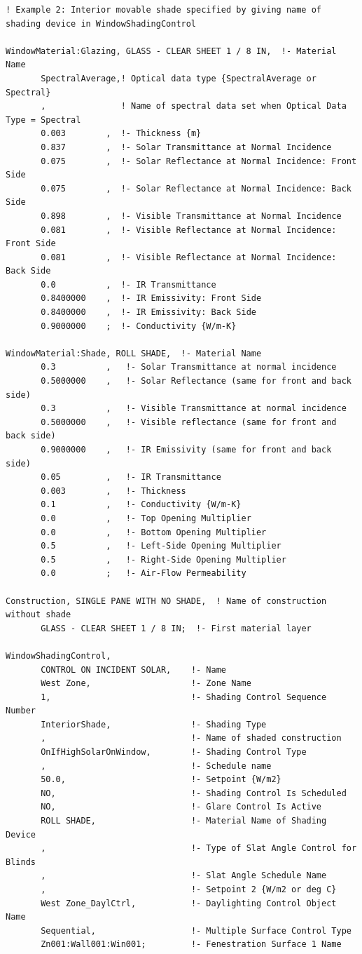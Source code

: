 \begin{lstlisting}
! Example 2: Interior movable shade specified by giving name of shading device in WindowShadingControl

WindowMaterial:Glazing, GLASS - CLEAR SHEET 1 / 8 IN,  !- Material Name
       SpectralAverage,! Optical data type {SpectralAverage or Spectral}
       ,               ! Name of spectral data set when Optical Data Type = Spectral
       0.003        ,  !- Thickness {m}
       0.837        ,  !- Solar Transmittance at Normal Incidence
       0.075        ,  !- Solar Reflectance at Normal Incidence: Front Side
       0.075        ,  !- Solar Reflectance at Normal Incidence: Back Side
       0.898        ,  !- Visible Transmittance at Normal Incidence
       0.081        ,  !- Visible Reflectance at Normal Incidence: Front Side
       0.081        ,  !- Visible Reflectance at Normal Incidence: Back Side
       0.0          ,  !- IR Transmittance
       0.8400000    ,  !- IR Emissivity: Front Side
       0.8400000    ,  !- IR Emissivity: Back Side
       0.9000000    ;  !- Conductivity {W/m-K}

WindowMaterial:Shade, ROLL SHADE,  !- Material Name
       0.3          ,   !- Solar Transmittance at normal incidence
       0.5000000    ,   !- Solar Reflectance (same for front and back side)
       0.3          ,   !- Visible Transmittance at normal incidence
       0.5000000    ,   !- Visible reflectance (same for front and back side)
       0.9000000    ,   !- IR Emissivity (same for front and back side)
       0.05         ,   !- IR Transmittance
       0.003        ,   !- Thickness
       0.1          ,   !- Conductivity {W/m-K}
       0.0          ,   !- Top Opening Multiplier
       0.0          ,   !- Bottom Opening Multiplier
       0.5          ,   !- Left-Side Opening Multiplier
       0.5          ,   !- Right-Side Opening Multiplier
       0.0          ;   !- Air-Flow Permeability

Construction, SINGLE PANE WITH NO SHADE,  ! Name of construction without shade
       GLASS - CLEAR SHEET 1 / 8 IN;  !- First material layer

WindowShadingControl,
       CONTROL ON INCIDENT SOLAR,    !- Name
       West Zone,                    !- Zone Name
       1,                            !- Shading Control Sequence Number
       InteriorShade,                !- Shading Type
       ,                             !- Name of shaded construction
       OnIfHighSolarOnWindow,        !- Shading Control Type
       ,                             !- Schedule name
       50.0,                         !- Setpoint {W/m2}
       NO,                           !- Shading Control Is Scheduled
       NO,                           !- Glare Control Is Active
       ROLL SHADE,                   !- Material Name of Shading Device
       ,                             !- Type of Slat Angle Control for Blinds
       ,                             !- Slat Angle Schedule Name
       ,                             !- Setpoint 2 {W/m2 or deg C}
       West Zone_DaylCtrl,           !- Daylighting Control Object Name
       Sequential,                   !- Multiple Surface Control Type
       Zn001:Wall001:Win001;         !- Fenestration Surface 1 Name


\end{lstlisting}
